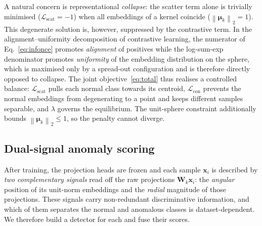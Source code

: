 \documentclass[preprint,12pt]{elsarticle}
\newcommand{\norm}[1]{\left\lVert #1 \right\rVert}
\newcommand{\Lcross}{\mathcal{L}_{\mathrm{con}}}
\newcommand{\Lscat}{\mathcal{L}_{\mathrm{scat}}}
\newcommand{\xx}{\bm{x}}
\newcommand{\WW}{\bm{W}}
\newcommand{\mmu}{\bm{\mu}}
\begin{document}
A natural concern is representational \emph{collapse}: the scatter term alone is
trivially minimised ($\Lscat=-1$) when all embeddings of a kernel coincide
($\norm{\mmu_k}_2=1$). This degenerate solution is, however, suppressed by the
contrastive term. In the alignment--uniformity decomposition of contrastive
learning, the numerator of Eq.~\eqref{eq:infonce} promotes \emph{alignment} of
positives while the log-sum-exp denominator promotes \emph{uniformity} of the
embedding distribution on the sphere, which is maximised only by a spread-out
configuration and is therefore directly opposed to collapse. The joint
objective~\eqref{eq:total} thus realises a controlled balance: $\Lscat$ pulls
each normal class towards its centroid, $\Lcross$ prevents the normal embeddings
from degenerating to a point and keeps different samples separable, and
$\lambda$ governs the equilibrium. The unit-sphere constraint additionally
bounds $\norm{\mmu_k}_2\le 1$, so the penalty cannot diverge.

\subsection{Dual-signal anomaly scoring}
\label{subsec:detection}

After training, the projection heads are frozen and each sample $\xx_i$ is
described by \emph{two complementary signals} read off the raw projections
$\WW_k\xx_i$: the \emph{angular} position of its unit-norm embeddings and the
\emph{radial} magnitude of those projections. These signals carry
non-redundant discriminative information, and which of them separates the
normal and anomalous classes is dataset-dependent. We therefore build a
detector for each and fuse their scores.
\end{document}
